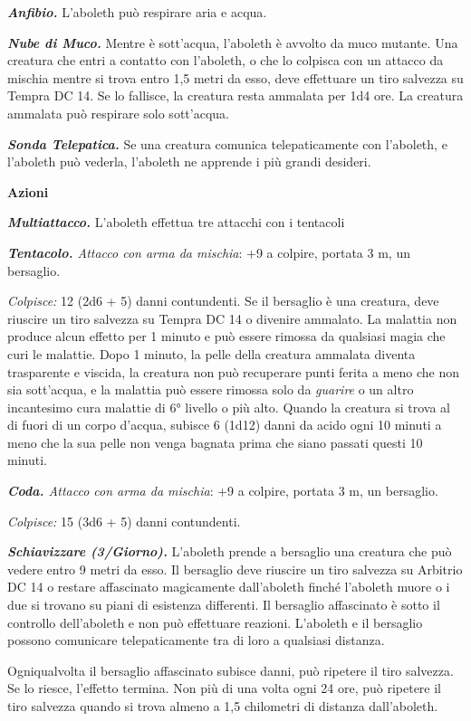 \begin{multicols}{2}
\emph{\textbf{Anfibio.}} L'aboleth può respirare aria e acqua.

\emph{\textbf{Nube di Muco.}} Mentre è sott'acqua, l'aboleth è avvolto
da muco mutante. Una creatura che entri a contatto con l'aboleth, o che
lo colpisca con un attacco da mischia mentre si trova entro 1,5 metri da
esso, deve effettuare un tiro salvezza su Tempra DC 14. Se lo
fallisce, la creatura resta ammalata per 1d4 ore. La creatura ammalata
può respirare solo sott'acqua.

\emph{\textbf{Sonda Telepatica.}} Se una creatura comunica
telepaticamente con l'aboleth, e l'aboleth può vederla, l'aboleth ne
apprende i più grandi desideri.

\textbf{Azioni}

\emph{\textbf{Multiattacco.}} L'aboleth effettua tre attacchi con i
tentacoli

\emph{\textbf{Tentacolo.} Attacco con arma da mischia}: +9 a colpire,
portata 3 m, un bersaglio.

\emph{Colpisce:} 12 (2d6 + 5) danni contundenti. Se il bersaglio è una
creatura, deve riuscire un tiro salvezza su Tempra DC 14 o
divenire ammalato. La malattia non produce alcun effetto per 1 minuto e
può essere rimossa da qualsiasi magia che curi le malattie. Dopo 1
minuto, la pelle della creatura ammalata diventa trasparente e viscida,
la creatura non può recuperare punti ferita a meno che non sia
sott'acqua, e la malattia può essere rimossa solo da \emph{guarire} o un
altro incantesimo cura malattie di 6° livello o più alto. Quando la
creatura si trova al di fuori di un corpo d'acqua, subisce 6 (1d12)
danni da acido ogni 10 minuti a meno che la sua pelle non venga bagnata
prima che siano passati questi 10 minuti.

\emph{\textbf{Coda.} Attacco con arma da mischia}: +9 a colpire, portata
3 m, un bersaglio.

\emph{Colpisce:} 15 (3d6 + 5) danni contundenti.

\emph{\textbf{Schiavizzare (3/Giorno).}} L'aboleth prende a bersaglio
una creatura che può vedere entro 9 metri da esso. Il bersaglio deve
riuscire un tiro salvezza su Arbitrio DC 14 o restare affascinato
magicamente dall'aboleth finché l'aboleth muore o i due si trovano su
piani di esistenza differenti. Il bersaglio affascinato è sotto il
controllo dell'aboleth e non può effettuare reazioni. L'aboleth e il
bersaglio possono comunicare telepaticamente tra di loro a qualsiasi
distanza.

Ogniqualvolta il bersaglio affascinato subisce danni, può ripetere il
tiro salvezza. Se lo riesce, l'effetto termina. Non più di una volta
ogni 24 ore, può ripetere il tiro salvezza quando si trova almeno a 1,5
chilometri di distanza dall'aboleth.


\end{multicols}
